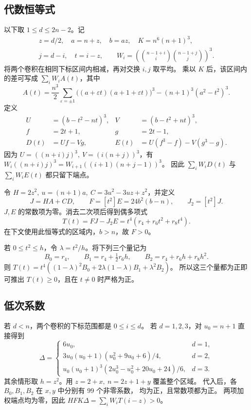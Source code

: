 \documentclass[11pt,UTF8,fontset=fandol]{ctexart}
\begin{document}
\subsection{代数恒等式}

以下取 \(1\le d\le2n-2\)。记
\begin{gather*}
 z=d/2,\quad a=n+z,\quad b=az,\quad K=n^6(n+1)^3,\\
 j=d-i,\quad t=i-z,\qquad W_i=\left(\binom{n-1+i}{i}\binom{n-1+j}{j}\right)^3.
\end{gather*}
将两个卷积在相同下标区间内相减，再对交换 \(i,j\) 取平均。
乘以 \(K\) 后，该区间内的差可写成 \(\sum_i W_i A(t)\)，其中
\[
 A(t)=\frac{n^3}{2}\sum_{\varepsilon=\pm1}
 \bigl((a+\varepsilon t)(a+1+\varepsilon t)\bigr)^3
 -(n+1)^3(a^2-t^2)^3.
\]
定义
\begin{align*}
 U&=(b-t^2-nt)^3,& V&=(b-t^2+nt)^3,\\
 f&=2t+1,&g&=2t-1,\\
 D(t)&=Uf-Vg,& E(t)&=U(f^3-f)-V(g^3-g).
\end{align*}
因为 \(U=((n+i)j)^3,\ V=(i(n+j))^3\)，有
\(W_i((n+i)j)^3=W_{i+1}((i+1)(n+j-1))^3\)。
因此 \(\sum_i W_iD(t)\) 与 \(\sum_i W_iE(t)\) 都只留下端点。

令 \(H=2z^2,\ u=(n+1)a,\ C=3u^2-3uz+z^2\)，并定义
\[
 J=HA+CD,\qquad F=[t^2]E=24b^2(b-n),\qquad J_2=[t^2]J.
\]
\(J,E\) 的常数项为零。消去二次项后得到偶多项式
\[
 T(t)=FJ-J_2E=t^4(r_4+r_6t^2+r_8t^4).
\]
在下文使用此恒等式的区域内，\(b>n\)，故 \(F>0\)。

若 \(0\le t^2\le h\)，令 \(\lambda=t^2/h\)。将下列三个量记为
\[
 B_0=r_4,\qquad B_1=r_4+\tfrac12r_6h,\qquad B_2=r_4+r_6h+r_8h^2.
\]
则 \(T(t)=t^4((1-\lambda)^2B_0+2\lambda(1-\lambda)B_1+\lambda^2 B_2)\)。
所以这三个量都为正即可推出 \(T(t)\ge0\)，且在 \(t\ne0\) 时严格为正。

\subsection{低次系数}

若 \(d<n\)，两个卷积的下标范围都是 \(0\le i\le d\)。
若 \(d=1,2,3\)，对 \(u_0=n+1\) 直接得到
\[
 \Delta=
 \begin{cases}
 6u_0,&d=1,\\
 3u_0(u_0+1)(u_0^2+9u_0+6)/4,&d=2,\\
 u_0(u_0+1)^3(2u_0^3-u_0^2+20u_0+24)/6,&d=3.
 \end{cases}
\]
其余情形取 \(h=z^2\)。用 \(z=2+x,\ n=2z+1+y\) 覆盖整个区域。
代入后，各 \(B_0,B_1,B_2\) 在 \(x,y\) 中分别有 99 个非零系数，
均为正，且常数项都为正。
两项加权端点均为零，因此 \(HFK\Delta=\sum_iW_iT(i-z)>0\)。
\end{document}
